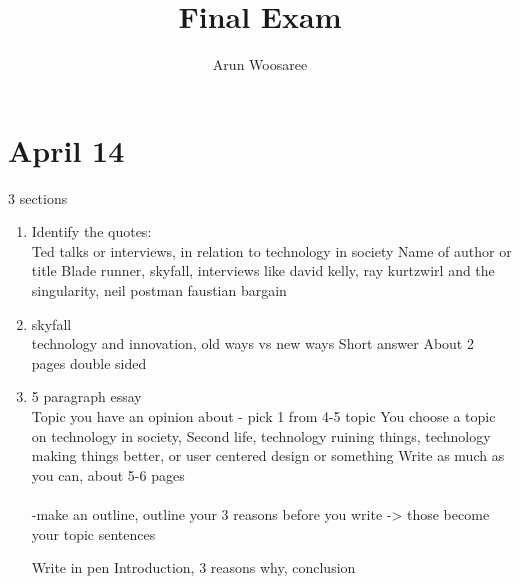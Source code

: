 \documentclass{article}
\title{Final Exam}
\author{Arun Woosaree}
\begin{document}
\maketitle
\section{April 14}

3 sections

\begin{enumerate}
 \item Identify the quotes:\\
       Ted talks or interviews, in relation to technology in society
       Name of author or title
       Blade runner, skyfall, interviews like david kelly, ray kurtzwirl and the singularity, neil postman faustian bargain

 \item skyfall\\
       technology and innovation, old ways vs new ways
       Short answer
       About 2 pages double sided

 \item 5 paragraph essay\\
       Topic you have an opinion about - pick 1 from 4-5 topic
       You choose a topic on technology in society,
       Second life, technology ruining things, technology making things better, or user centered design or something
       Write as much as you can, about 5-6 pages\\ \\
       -make an outline, outline your 3 reasons before you write -> those become your topic sentences

       Write in pen
       Introduction, 3 reasons why, conclusion
\end{enumerate}
\end{document}
